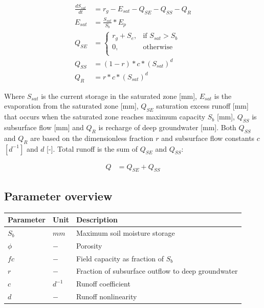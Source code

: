 \begin{align}
	\frac{dS_{sat}}{dt} &= r_g - E_{sat} - Q_{SE} - Q_{SS} - Q_{R}\\
	E_{sat} &= \frac{S_{sat}}{S_b}*E_p\\
	Q_{SE} &= \begin{cases}
		r_g+S_e, &\text{if } S_{sat} > S_b \\
		0, & \text{otherwise} \\
	\end{cases} \\
	Q_{SS} &= (1-r)*c*\left(S_{sat}\right)^d\\
	Q_{R} &= r*c*\left(S_{sat}\right)^d
\end{align}

Where $S_{sat}$ is the current storage in the saturated zone [mm], $E_{sat}$ is the evaporation from the saturated zone [mm], $Q_{SE}$ saturation excess runoff [mm] that occurs when the saturated zone reaches maximum capacity $S_b$ [mm], $Q_{SS}$ is subsurface flow [mm] and $Q_R$ is recharge of deep groundwater [mm]. Both $Q_{SS}$ and $Q_R$ are based on the dimensionless fraction $r$ and subsurface flow constants $c$ $[d^{-1}]$ and $d$ [-]. Total runoff is the sum of $Q_{SE}$ and $Q_{SS}$:

\begin{align}
	Q &= Q_{SE} + Q_{SS}
\end{align}

\subsection{Parameter overview}
\begin{table}[htbp]
  \centering
    \begin{tabular}{lll}
    \toprule
    Parameter & Unit  & Description \\
    \midrule
    $S_b$ & $mm$  & Maximum soil moisture storage \\
    $\phi$ & $-$   & Porosity \\
    $fc$  & $-$   & Field capacity as fraction of $S_b$ \\
    $r$   & $-$   & Fraction of subsurface outflow to deep groundwater \\
    $c$   & $d^{-1}$ & Runoff coefficient \\
    $d$   & $-$   & Runoff nonlinearity \\
    \bottomrule
    \end{tabular}%
  \label{tab:addlabel}%
\end{table}%

